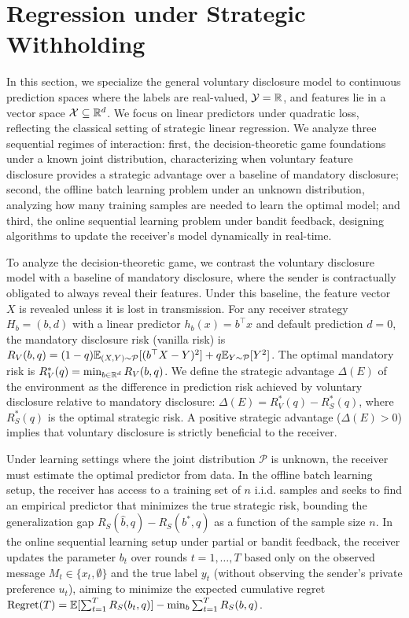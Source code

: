 \section{Regression under Strategic Withholding}
\label{sec:regression}

In this section, we specialize the general voluntary disclosure model to continuous prediction spaces where the labels are real-valued, $\mathcal{Y} = \mathbb{R}$, and features lie in a vector space $\mathcal{X} \subseteq \mathbb{R}^d$. We focus on linear predictors under quadratic loss, reflecting the classical setting of strategic linear regression. We analyze three sequential regimes of interaction: first, the decision-theoretic game foundations under a known joint distribution, characterizing when voluntary feature disclosure provides a strategic advantage over a baseline of mandatory disclosure; second, the offline batch learning problem under an unknown distribution, analyzing how many training samples are needed to learn the optimal model; and third, the online sequential learning problem under bandit feedback, designing algorithms to update the receiver's model dynamically in real-time.

To analyze the decision-theoretic game, we contrast the voluntary disclosure model with a baseline of mandatory disclosure, where the sender is contractually obligated to always reveal their features. Under this baseline, the feature vector $X$ is revealed unless it is lost in transmission. For any receiver strategy $H_b = (b, d)$ with a linear predictor $h_b(x) = b^\top x$ and default prediction $d = 0$, the mandatory disclosure risk (vanilla risk) is $R_V(b, q) = (1 - q)\mathbb{E}_{(X, Y) \sim \mathcal{P}} [ (b^\top X - Y)^2 ] + q\mathbb{E}_{Y \sim \mathcal{P}} [ Y^2 ]$. The optimal mandatory risk is $R_V^*(q) = \min_{b \in \mathbb{R}^d} R_V(b, q)$. We define the strategic advantage $\Delta(E)$ of the environment as the difference in prediction risk achieved by voluntary disclosure relative to mandatory disclosure: $\Delta(E) = R_V^*(q) - R_S^*(q)$, where $R_S^*(q)$ is the optimal strategic risk. A positive strategic advantage ($\Delta(E) > 0$) implies that voluntary disclosure is strictly beneficial to the receiver.

Under learning settings where the joint distribution $\mathcal{P}$ is unknown, the receiver must estimate the optimal predictor from data. In the offline batch learning setup, the receiver has access to a training set of $n$ i.i.d. samples and seeks to find an empirical predictor that minimizes the true strategic risk, bounding the generalization gap $R_S(\hat{b}, q) - R_S(b^*, q)$ as a function of the sample size $n$. In the online sequential learning setup under partial or bandit feedback, the receiver updates the parameter $b_t$ over rounds $t=1,\dots,T$ based only on the observed message $M_t \in \{x_t, \emptyset\}$ and the true label $y_t$ (without observing the sender's private preference $u_t$), aiming to minimize the expected cumulative regret $\text{Regret}(T) = \mathbb{E}[\sum_{t=1}^T R_S(b_t, q)] - \min_{b} \sum_{t=1}^T R_S(b, q)$.

